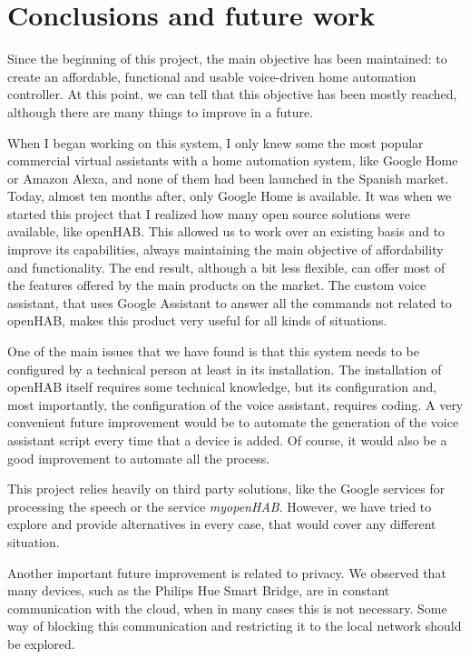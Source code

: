 \chapter{Conclusions and future work}

Since the beginning of this project, the main objective has been maintained: to create an affordable, functional and usable voice-driven
home automation controller. At this point, we can tell that this objective has been mostly reached, although there are many things
to improve in a future.

When I began working on this system, I only knew some the most popular commercial virtual assistants with a home automation system,
like Google Home or Amazon Alexa, and none of them had been launched in the Spanish market. Today, almost ten months after, only
Google Home is available. It was when we started this project that I realized how many open source solutions were available, like openHAB.
This allowed us to work over an existing basis and to improve its capabilities, always maintaining the main objective of affordability
and functionality. The end result, although a bit less flexible, can offer most of the features offered by the main products on the
market. The custom voice assistant, that uses Google Assistant to answer all the commands not related to openHAB, makes this product
very useful for all kinds of situations.

One of the main issues that we have found is that this system needs to be configured by a technical person at least in its installation.
The installation of openHAB itself requires some technical knowledge, but its configuration and, most importantly, the configuration
of the voice assistant, requires coding. A very convenient future improvement would be to automate the generation of the voice
assistant script every time that a device is added. Of course, it would also be a good improvement to automate all the process.

This project relies heavily on third party solutions, like the Google services for processing the speech or the service
\textit{myopenHAB}. However, we have tried to explore and provide alternatives in every case, that would cover any different situation.

Another important future improvement is related to privacy. We observed that many devices, such as the Philips Hue Smart Bridge,
are in constant communication with the cloud, when in many cases this is not necessary. Some way of blocking this communication
and restricting it to the local network should be explored.

